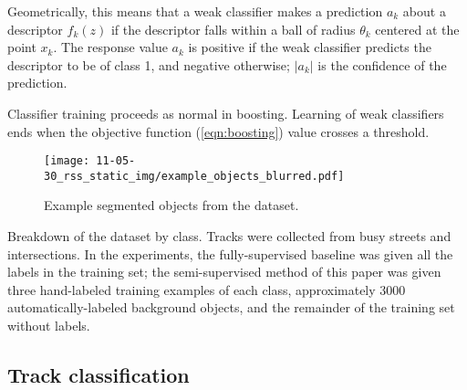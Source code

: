 \documentclass[conference]{IEEEtran}
\begin{document}
Geometrically, this means that a weak classifier makes a prediction $a_k$ about a descriptor $f_k(z)$ if the descriptor falls within a ball of radius $\theta_k$ centered at the point $x_k$. The response value $a_k$ is positive if the weak classifier predicts the descriptor to be of class 1, and negative otherwise; $|a_k|$ is the confidence of the prediction.

Classifier training proceeds as normal in boosting. Learning of weak classifiers ends when the objective function (\ref{eqn:boosting}) value crosses a threshold.



\begin{figure}
  \centering
  \texttt{[image: 11-05-30\_rss\_static\_img/example\_objects\_blurred.pdf]}
  \caption{Example segmented objects from the dataset.}
  \label{fig:example_objs}
\end{figure}


\begin{table}
  \centering
  
  \caption{Breakdown of the dataset by class.  Tracks were collected from busy streets and intersections.  In the experiments, the fully-supervised baseline was given all the labels in the training set; the semi-supervised method of this paper was given three hand-labeled training examples of each class, approximately 3000 automatically-labeled background objects, and the remainder of the training set without labels.}
  \label{tab:stc_tab}
\end{table}


\subsection{Track classification}

\newcommand{\Htr}{H^{\mbox{\tiny{Tr}}}}
\newcommand{\Hf}{H^{\mbox{\tiny{F}}}}
\end{document}
